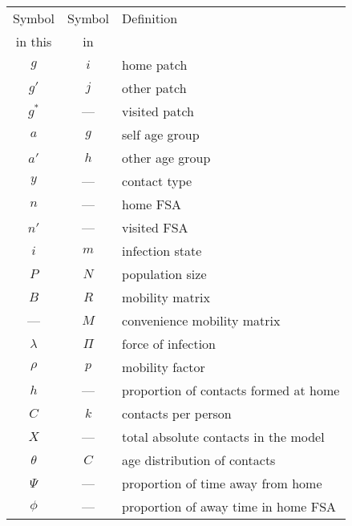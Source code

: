 \begin{tabular}{ccl}
  \toprule
   Symbol   &        Symbol        & Definition                            \\
   in this  & in \cite{Arenas2020} &                                       \\
  \midrule
     $g$    &         $i$          & home patch                            \\
    $g'$    &         $j$          & other patch                           \\
    $g^*$   &         ---          & visited patch                         \\
     $a$    &         $g$          & self age group                        \\
    $a'$    &         $h$          & other age group                       \\
     $y$    &         ---          & contact type                          \\
     $n$    &         ---          & home FSA                              \\
    $n'$    &         ---          & visited FSA                           \\
     $i$    &         $m$          & infection state                       \\
     $P$    &         $N$          & population size                       \\
     $B$    &         $R$          & mobility matrix                       \\
     ---    &         $M$          & convenience mobility matrix           \\
  $\lambda$ &        $\Pi$         & force of infection                    \\
   $\rho$   &         $p$          & mobility factor                       \\
     $h$    &         ---          & proportion of contacts formed at home \\
     $C$    &         $k$          & contacts per person                   \\
     $X$    &         ---          & total absolute contacts in the model  \\
  $\theta$  &         $C$          & age distribution of contacts          \\
   $\Psi$   &         ---          & proportion of time away from home     \\
   $\phi$   &         ---          & proportion of away time in home FSA   \\
  \bottomrule
\end{tabular}
  
